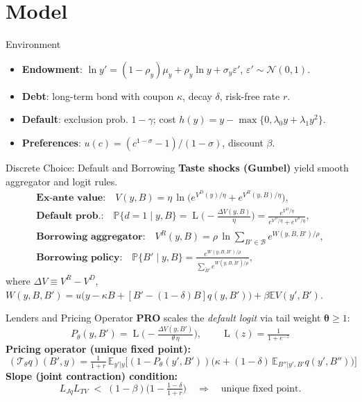\documentclass[aspectratio=169,11pt,professionalfonts]{beamer}
\newcommand{\E}{\mathbb{E}}
\newcommand{\bbP}{\mathbb{P}}
\newcommand{\1}{\mathbb{1}}
\DeclareMathOperator{\Lsig}{L}
\begin{document}
\section{Model}

\begin{frame}{Environment}
  \begin{itemize}
    \item \textbf{Endowment}: $\ln y'=(1-\rho_y)\mu_y+\rho_y\ln y+\sigma_y\varepsilon'$, $\varepsilon'\sim\mathcal N(0,1)$.
    \item \textbf{Debt}: long-term bond with coupon $\kappa$, decay $\delta$, risk-free rate $r$.
    \item \textbf{Default}: exclusion prob. $1-\gamma$; cost $h(y)=y-\max\{0,\lambda_0 y+\lambda_1 y^2\}$.
    \item \textbf{Preferences}: $u(c)=(c^{1-\sigma}-1)/(1-\sigma)$, discount $\beta$.
  \end{itemize}
\end{frame}

\begin{frame}{Discrete Choice: Default and Borrowing}
  \textbf{Taste shocks (Gumbel)} yield smooth aggregator and logit rules.
  \begin{gather*}
    \textbf{Ex-ante value:}\quad V(y,B)=\eta\,\ln\!\Big( e^{V^D(y)/\eta}+e^{V^R(y,B)/\eta}\Big),\\
    \textbf{Default prob.:}\quad \bbP\{d{=}1\mid y,B\}=\Lsig\!\Big(-\tfrac{\Delta V(y,B)}{\eta}\Big)=\tfrac{e^{V^D/\eta}}{e^{V^D/\eta}+e^{V^R/\eta}},\\
    \textbf{Borrowing aggregator:}\quad V^R(y,B)=\rho\,\ln\!\sum_{B'\in\mathcal B} e^{W(y,B,B')/\rho},\\
    \textbf{Borrowing policy:}\quad \bbP\{B'\mid y,B\}=\frac{e^{W(y,B,B')/\rho}}{\sum_{\tilde B'} e^{W(y,B,\tilde B')/\rho}},
  \end{gather*}
  \vspace{-0.5em}
  where $\Delta V\equiv V^R{-}V^D$, $W(y,B,B')=u\big(y-\kappa B+[B'-(1{-}\delta)B]q(y,B')\big)+\beta\E V(y',B')$.
\end{frame}

\begin{frame}{Lenders and Pricing Operator}
  \textbf{PRO} scales the \emph{default logit} via tail weight $\symbf{\theta} \ge 1$:
  \begin{equation*}
    \boxed{\;P_{\theta}(y,B')=\Lsig\!\Big(-\tfrac{\Delta V(y,B')}{\theta\,\eta}\Big),\qquad \Lsig(z)=\tfrac{1}{1+e^{-z}}\;}
  \end{equation*}
  \textbf{Pricing operator (unique fixed point):}
  \begin{equation*}
    \boxed{\;(\mathcal T_{\theta} q)(B',y)=\tfrac{1}{1+r}\,\E_{y'|y}\!\Big[(1{-}P_{\theta}(y',B'))\big(\kappa+(1{-}\delta)\,\E_{B''|y',B'}q(y',B'')\big)\Big]\;}
  \end{equation*}
  \textbf{Slope (joint contraction) condition:}
  \begin{equation*}
    L_{Jq}L_{TV}\;<\;(1-\beta)\Big(1-\tfrac{1-\delta}{1+r}\Big)\quad\Rightarrow\quad \text{unique fixed point}.
  \end{equation*}
\end{frame}
\end{document}
